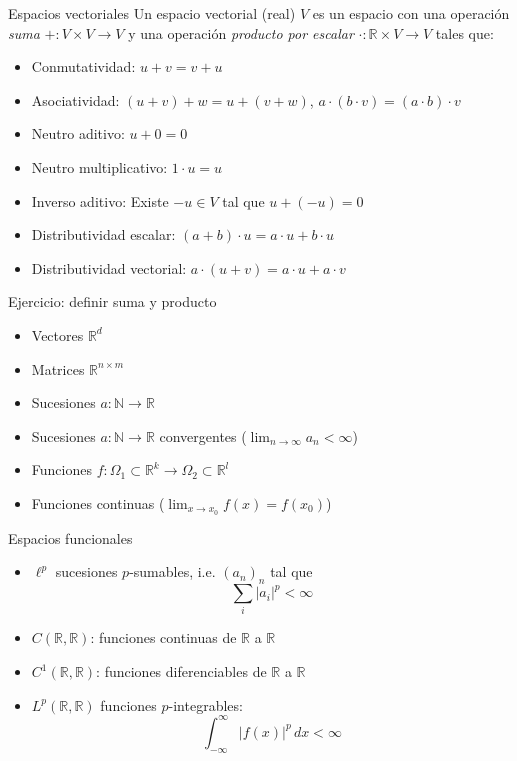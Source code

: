 \documentclass[12pt,aspectratio=169,xcolor=dvipsnames]{beamer}
\newcommand{\R}{\mathbb{R}}
\begin{document}
\begin{frame}[t]{Espacios vectoriales}
    Un espacio vectorial (real) $V$ es un espacio con una operación \emph{suma} $+:V\times V \to V$ y una operación \emph{producto por escalar} $\cdot: \R\times V \to V$ tales que:
    \begin{itemize}
        \item Conmutatividad: $u+v=v+u$
        \item Asociatividad: $(u+v)+w =u+(v+w)$, $a\cdot(b\cdot v)=(a\cdot b)\cdot v$
        \item Neutro aditivo: $u + 0 = 0$
        \item Neutro multiplicativo: $1\cdot u = u$
        \item Inverso aditivo: Existe $-u\in V$ tal que $u + (-u) = 0$
        \item Distributividad escalar: $(a+b)\cdot u = a\cdot u + b\cdot u$
        \item Distributividad vectorial: $a\cdot (u+v) = a\cdot u + a\cdot v$
    \end{itemize}
    
    \vspace{0.5cm}
\end{frame}
\begin{frame}{Ejercicio: definir suma y producto}
    \begin{itemize}
        \item Vectores $\R^d$
        \item Matrices $\R^{n\times m}$
        \item Sucesiones $a:\mathbb N\to \R$
        \item Sucesiones $a:\mathbb N \to \R$ convergentes ($\lim_{n\to\infty} a_n < \infty$)
        \item Funciones $f:\Omega_1 \subset \R^k \to \Omega_2\subset \R^l$
        \item Funciones continuas ($\lim_{x\to x_0} f(x) = f(x_0)$)
    \end{itemize}

    \vspace{1cm}
\end{frame}
\begin{frame}{Espacios funcionales}
    \begin{itemize}
        \item $\ell^p$ sucesiones $p$-sumables, i.e. $(a_n)_n$ tal que
                $$ \sum_i |a_i|^p < \infty $$
        \item $C(\R,\R)$: funciones continuas de $\R$ a $\R$
        \item $C^1(\R, \R)$: funciones diferenciables de $\R$ a $\R$
        \item $L^p(\R,\R)$ funciones $p$-integrables:
                $$\int_{-\infty}^\infty |f(x)|^p\,dx < \infty $$
    \end{itemize}
\end{frame}
\end{document}
